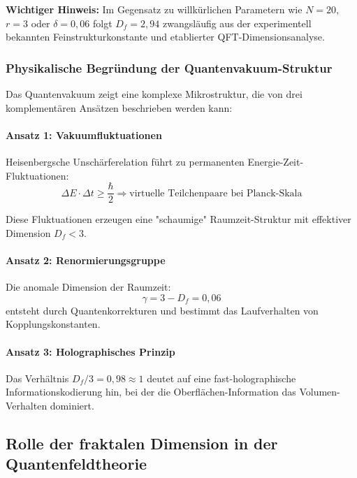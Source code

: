 \documentclass[12pt,a4paper]{article}
\theoremstyle{definition}
\begin{document}
	\begin{tcolorbox}[colback=red!5!white,colframe=red!75!black,title=Methodische Transparenz]
		\textbf{Wichtiger Hinweis:} Im Gegensatz zu willkürlichen Parametern wie $N=20$, $r=3$ oder $\delta=0{,}06$ folgt $D_f = 2{,}94$ zwangsläufig aus der experimentell bekannten Feinstrukturkonstante und etablierter QFT-Dimensionsanalyse.
	\end{tcolorbox}
	
	\subsubsection{Physikalische Begründung der Quantenvakuum-Struktur}
	
	Das Quantenvakuum zeigt eine komplexe Mikrostruktur, die von drei komplementären Ansätzen beschrieben werden kann:
	
	\paragraph{Ansatz 1: Vakuumfluktuationen}
	Heisenbergsche Unschärferelation führt zu permanenten Energie-Zeit-Fluktuationen:
	\begin{equation}
		\Delta E \cdot \Delta t \geq \frac{\hbar}{2} \Rightarrow \text{virtuelle Teilchenpaare bei Planck-Skala}
	\end{equation}
	
	Diese Fluktuationen erzeugen eine "schaumige" Raumzeit-Struktur mit effektiver Dimension $D_f < 3$.
	
	\paragraph{Ansatz 2: Renormierungsgruppe}
	Die anomale Dimension der Raumzeit:
	\begin{equation}
		\gamma = 3 - D_f = 0{,}06
	\end{equation}
	entsteht durch Quantenkorrekturen und bestimmt das Laufverhalten von Kopplungskonstanten.
	
	\paragraph{Ansatz 3: Holographisches Prinzip}
	Das Verhältnis $D_f/3 = 0{,}98 \approx 1$ deutet auf eine fast-holographische Informationskodierung hin, bei der die Oberflächen-Information das Volumen-Verhalten dominiert.
	
	\subsection{Rolle der fraktalen Dimension in der Quantenfeldtheorie}
	
\end{document}
